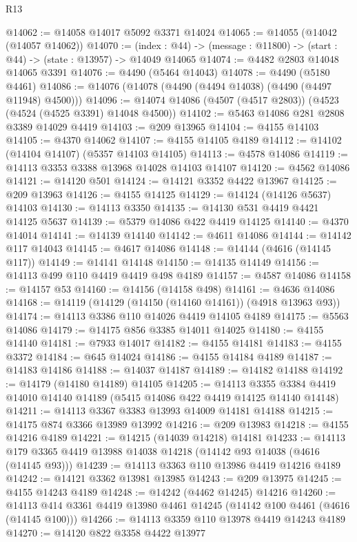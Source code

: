 \begin{lexlean}{R13}
\begin{coremodule}
@14062 := @14058 @14017 @5092 @3371 @14024
@14065 := @14055 (@14042 (@14057 @14062))
@14070 := (index : @44) -> (message : @11800) -> (start : @44) -> (state : @13957) -> @14049 @14065
@14074 := @4482 @2803 @14048 @14065 @3391
@14076 := @4490 (@5464 @14043)
@14078 := @4490 (@5180 @4461)
@14086 := @14076 (@14078 (@4490 (@4494 @14038) (@4490 (@4497 @11948) @4500)))
@14096 := @14074 @14086 (@4507 (@4517 @2803)) (@4523 (@4524 (@4525 @3391) @14048 @4500))
@14102 := @5463 @14086 @281 @2808 @3389 @14029 @4419
@14103 := @209 @13965
@14104 := @4155 @14103
@14105 := @4370 @14062
@14107 := @4155 @14105 @4189
@14112 := @14102 (@14104 @14107) (@5357 @14103 @14105)
@14113 := @4578 @14086
@14119 := @14113 @3353 @3388 @13968 @14028 @14103 @14107
@14120 := @4562 @14086
@14121 := @14120 @501
@14124 := @14121 @3352 @4422 @13967
@14125 := @209 @13963
@14126 := @4155 @14125
@14129 := @14124 (@14126 @5637) @14103
@14130 := @14113 @3350
@14135 := @14130 @531 @4419 @4421 @14125 @5637
@14139 := @5379 @14086 @422 @4419 @14125
@14140 := @4370 @14014
@14141 := @14139 @14140
@14142 := @4611 @14086
@14144 := @14142 @117 @14043
@14145 := @4617 @14086
@14148 := @14144 (@4616 (@14145 @117))
@14149 := @14141 @14148
@14150 := @14135 @14149
@14156 := @14113 @499 @110 @4419 @4419 @498 @4189
@14157 := @4587 @14086
@14158 := @14157 @53
@14160 := @14156 (@14158 @498)
@14161 := @4636 @14086
@14168 := @14119 (@14129 (@14150 (@14160 @14161)) (@4918 @13963 @93))
@14174 := @14113 @3386 @110 @14026 @4419 @14105 @4189
@14175 := @5563 @14086
@14179 := @14175 @856 @3385 @14011 @14025
@14180 := @4155 @14140
@14181 := @7933 @14017
@14182 := @4155 @14181
@14183 := @4155 @3372
@14184 := @645 @14024
@14186 := @4155 @14184 @4189
@14187 := @14183 @14186
@14188 := @14037 @14187
@14189 := @14182 @14188
@14192 := @14179 (@14180 @14189) @14105
@14205 := @14113
    @3355
    @3384
    @4419
    @14010
    @14140
    @14189
    (@5415 @14086 @422 @4419 @14125 @14140 @14148)
@14211 := @14113 @3367 @3383 @13993 @14009 @14181 @14188
@14215 := @14175 @874 @3366 @13989 @13992
@14216 := @209 @13983
@14218 := @4155 @14216 @4189
@14221 := @14215 (@14039 @14218) @14181
@14233 := @14113 @179 @3365 @4419 @13988 @14038 @14218 (@14142 @93 @14038 (@4616 (@14145 @93)))
@14239 := @14113 @3363 @110 @13986 @4419 @14216 @4189
@14242 := @14121 @3362 @13981 @13985
@14243 := @209 @13975
@14245 := @4155 @14243 @4189
@14248 := @14242 (@4462 @14245) @14216
@14260 := @14113 @414 @3361 @4419 @13980 @4461 @14245 (@14142 @100 @4461 (@4616 (@14145 @100)))
@14266 := @14113 @3359 @110 @13978 @4419 @14243 @4189
@14270 := @14120 @822 @3358 @4422 @13977

\end{coremodule}
\end{lexlean}
